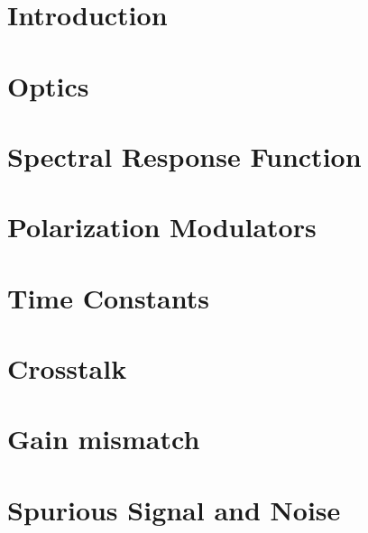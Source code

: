 \documentclass[
12pt, %
letterpaper, %
oneside, %
headinclude,footinclude, %
BCOR5mm, %
]{scrartcl}
\begin{document}

\section{Introduction}


\section{Optics}







\section{Spectral Response Function}


\section{Polarization Modulators}







\section{Time Constants}



\section{Crosstalk}


\section{Gain mismatch}




\section{Spurious Signal and Noise}

\end{document}
